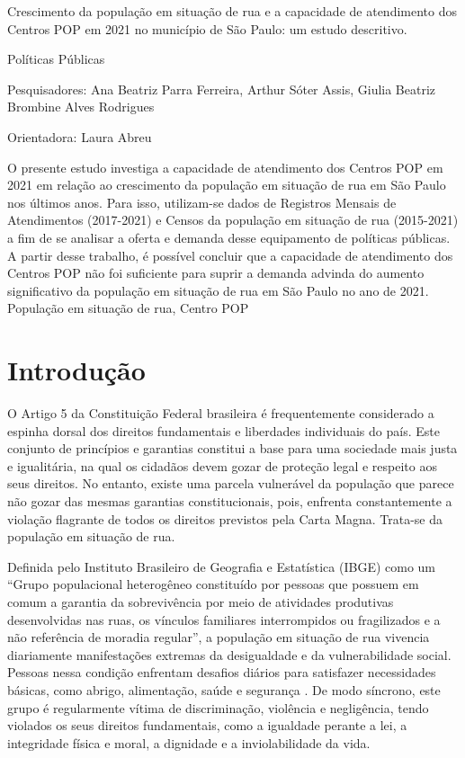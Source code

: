 \relatorio
{Crescimento da população em situação de rua e a capacidade de atendimento dos Centros POP em 2021 no município de São Paulo: um estudo descritivo. }
{
    \noindent Políticas Públicas

    \noindent Pesquisadores: Ana Beatriz Parra Ferreira, Arthur Sóter Assis, Giulia Beatriz Brombine Alves Rodrigues
    
    \noindent Orientadora: Laura Abreu
}
{
    O presente estudo investiga a capacidade de atendimento dos Centros POP em 2021 em relação ao crescimento da população em situação de rua em São Paulo nos últimos anos. Para isso, utilizam-se dados de Registros Mensais de Atendimentos (2017-2021) e Censos da população em situação de rua (2015-2021) a fim de se analisar a oferta e demanda desse equipamento de políticas públicas. A partir desse trabalho, é possível concluir que a capacidade de atendimento dos Centros POP não foi suficiente para suprir a demanda advinda do aumento significativo da população em situação de rua em São Paulo no ano de 2021.
}
{População em situação de rua, Centro POP}

\section{Introdução}

O Artigo 5 da Constituição Federal brasileira é frequentemente considerado a espinha dorsal dos direitos fundamentais e liberdades individuais do país. Este conjunto de princípios e garantias constitui a base para uma sociedade mais justa e igualitária, na qual os cidadãos devem gozar de proteção legal e respeito aos seus direitos. No entanto, existe uma parcela vulnerável da população que parece não gozar das mesmas garantias constitucionais, pois, enfrenta constantemente a violação flagrante de todos os direitos previstos pela Carta Magna. Trata-se da população em situação de rua.

Definida pelo Instituto Brasileiro de Geografia e Estatística (IBGE) como um “Grupo populacional heterogêneo constituído por pessoas que possuem em comum a garantia da sobrevivência por meio de atividades produtivas desenvolvidas nas ruas, os vínculos familiares interrompidos ou fragilizados e a não referência de moradia regular”, a população em situação de rua vivencia diariamente manifestações extremas da desigualdade e da vulnerabilidade social. Pessoas nessa condição enfrentam desafios diários para satisfazer necessidades básicas, como abrigo, alimentação, saúde e segurança  \cite{serafinocentro}. De modo síncrono, este grupo é regularmente vítima de discriminação, violência e negligência, tendo violados os seus direitos fundamentais, como a igualdade perante a lei, a integridade física e moral, a dignidade e a inviolabilidade da vida.

